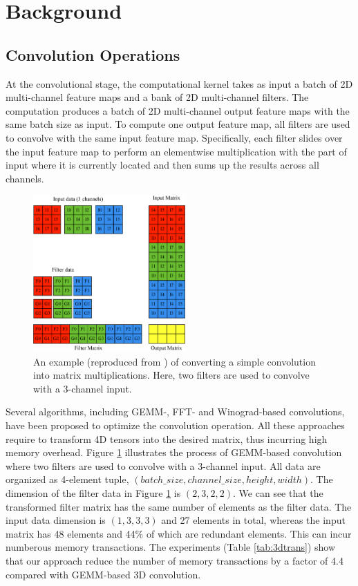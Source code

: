 
\section{Background}

\subsection{Convolution Operations}

At the convolutional stage, the computational kernel takes as input a batch of 2D multi-channel feature maps and a bank of  2D
multi-channel filters. The computation produces a batch of 2D multi-channel output feature maps with the same batch size as input. To
compute one output feature map, all filters are used to convolve with the same input feature map. Specifically, each filter slides over the
input feature map to perform an elementwise multiplication with the part of input where it is currently located and then sums up the
results across all channels.

\begin{figure}
\centering
  \includegraphics[width=0.75\columnwidth,height=6cm]{./figure/convlowering.eps}
  \caption{An example (reproduced from \cite{ChetlurWVCTCS14}) of converting a simple convolution into matrix multiplications. Here, two filters are used to convolve with a 3-channel input.}
  \label{fig:convlowering}
\end{figure}

{\color{red} Several algorithms, including GEMM-, FFT- and Winograd-based convolutions, have been proposed to optimize the convolution operation. All these approaches require to transform 4D tensors into the desired matrix, thus incurring high memory overhead. Figure
\ref{fig:convlowering} illustrates the process of GEMM-based convolution where two filters are used to convolve with a 3-channel input. All data are organized as
4-element tuple, $(batch\_size, channel\_size, height, width)$. The dimension of the filter data in Figure
\ref{fig:convlowering} is $(2, 3, 2, 2)$. We can see that the transformed filter matrix has the same number of elements as the filter data.
The input data dimension is $(1, 3, 3, 3)$ and 27 elements in total, whereas the input matrix has 48 elements and 44\% of which are redundant elements. This can incur numberous memory transactions. The experiments (Table \ref{tab:3dtrans}) show that our approach reduce the number of memory transactions by a factor of 4.4 compared with GEMM-based 3D convolution.}


